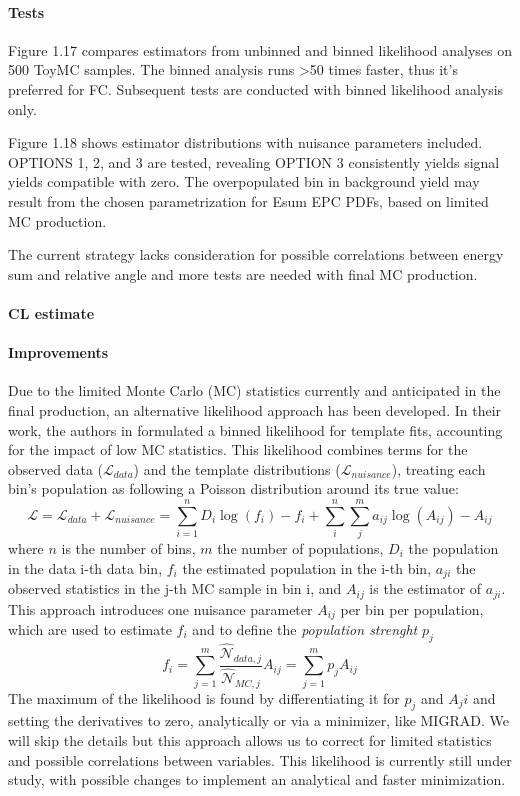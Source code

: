\begin{refsection}
\paragraph{Tests}
Figure 1.17 compares estimators from unbinned and binned likelihood analyses on 500 ToyMC samples. 
The binned analysis runs >50 times faster, thus it's preferred for FC. 
Subsequent tests are conducted with binned likelihood analysis only.

Figure 1.18 shows estimator distributions with nuisance parameters included. OPTIONS 1, 2, and 3 are tested, revealing OPTION 3 consistently yields signal yields compatible with zero. The overpopulated bin in background yield may result from the chosen parametrization for Esum EPC PDFs, based on limited MC production.

The current strategy lacks consideration for possible correlations between energy sum and relative angle and more tests are needed with final MC production. 

\paragraph{CL estimate}

\paragraph{Improvements}
Due to the limited Monte Carlo (MC) statistics currently and anticipated in the final production, an alternative likelihood approach has been developed. 
In their work, the authors in \cite{X17:likelihood:BB} formulated a binned likelihood for template fits, accounting for the impact of low MC statistics. This likelihood combines terms for the observed data ($\mathcal{L}_{data}$) and the template distributions ($\mathcal{L}_{nuisance}$), treating each bin's population as following a Poisson distribution around its true value:
\begin{equation}
    \mathcal{L} = \mathcal{L}_{data} + \mathcal{L}_{nuisance} =
    \sum_{i=1}^n D_i \log (f_i) - f_i + \sum_{i}^{n}\sum_{j}^{m}a_{ij}\log (A_{ij})-A_{ij}
\end{equation}
where $n$ is the number of bins, $m$ the number of populations, $D_i$ the population in the data i-th data bin, $f_i$ the estimated population in the i-th bin, $a_{ji}$ the observed statistics in the j-th MC sample in bin i, and $A_{ij}$ is the estimator of $a_{ji}$.
This approach introduces one nuisance parameter $A_{ij}$ per bin per population, which are used to estimate $f_i$ and to define the \textit{population strenght} $p_j$
\begin{equation}
    f_i=\sum_{j=1}^m \frac{\hat{\mathcal{N}}_{data,j}}{\hat{\mathcal{N}}_{MC,j}} A_{ij}= \sum_{j=1}^m p_j A_{ij}
\end{equation}
The maximum of the likelihood is found by differentiating it for
$p_j$ and $A_ji$ and setting the derivatives to zero, analytically or via a minimizer, like MIGRAD.
We will skip the details but this approach allows us to correct for limited statistics and possible correlations between variables.
This likelihood is currently still under study, with possible changes to implement an analytical and faster minimization.


\end{refsection}
